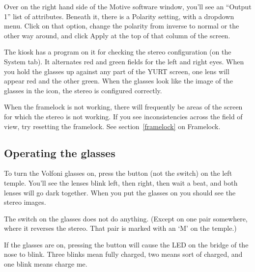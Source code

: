 \documentclass[11pt]{article}
\newcommand{\yurt}{YURT\xspace}
\newcommand{\menu}[1]{``#1''\xspace}
\newcommand{\button}[1]{\textsf{#1}\xspace}
\begin{document}
Over on the right hand side of the Motive software window, you'll see
an \menu{Output 1} list of attributes.  Beneath it, there is a
\button{Polarity} setting, with a dropdown menu.  Click on that option,
change the polarity from inverse to normal or the other way around,
and click \button{Apply} at the top of that column of the screen.


The kiosk has a program on it for checking the stereo configuration
(on the System tab).  It alternates red and green fields for the left
and right eyes.  When you hold the glasses up against any part of the
\yurt screen, one lens will appear red and the other green.  When the
glasses look like the image of the glasses in the icon, the stereo is
configured correctly.  

When the framelock is not working, there will frequently be areas of
the screen for which the stereo is not working.  If you see
inconsistencies across the field of view, try resetting the
framelock.  See section~\ref{framelock} on Framelock. 

\subsection{Operating the glasses}

To turn the Volfoni glasses on, press the button (not the switch) on
the left temple.  You'll see the lenses blink left, then right, then
wait a beat, and both lenses will go dark together.  When you put the
glasses on you should see the stereo images.

The switch on the glasses does not do
anything.  (Except on one pair somewhere, where it reverses the
stereo.  That pair is marked with an `M' on the temple.)

If the glasses are on, pressing the button will cause the LED on the
bridge of the nose to blink.  Three blinks mean fully charged, two
means sort of charged, and one blink means charge me.
\end{document}
